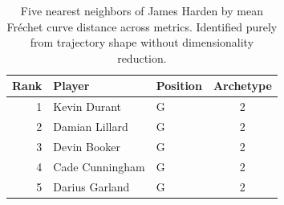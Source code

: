 \begin{table}[htbp]
  \centering\small
  \begin{tabular}{rllc}
    \toprule
    Rank & Player & Position & Archetype \\
    \midrule
    1 & Kevin Durant & G & 2 \\
    2 & Damian Lillard & G & 2 \\
    3 & Devin Booker & G & 2 \\
    4 & Cade Cunningham & G & 2 \\
    5 & Darius Garland & G & 2 \\
    \bottomrule
  \end{tabular}
  \caption{Five nearest neighbors of James Harden by mean Fr\'{e}chet curve distance across metrics. Identified purely from trajectory shape without dimensionality reduction.}
  \label{tab:James_Harden_frechet_curve_neighbors}
\end{table}

